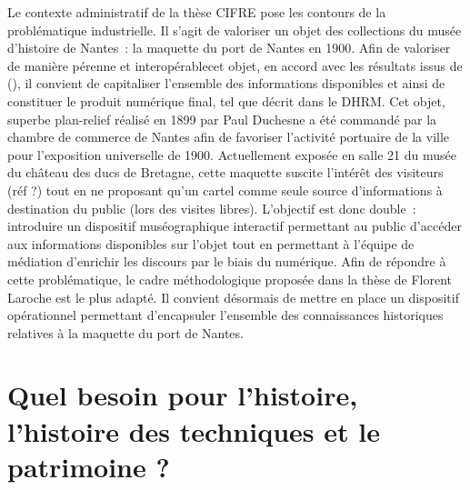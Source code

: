 \documentclass[a4paper,11pt,french]{article}
\begin{document}
Le contexte administratif de la thèse CIFRE pose les contours de la problématique industrielle. Il s'agit de valoriser un objet des collections du musée d'histoire de Nantes~: la maquette du port de Nantes en 1900. Afin de valoriser de manière pérenne et interopérablecet objet, en accord avec les résultats issus de (), il convient de capitaliser l'ensemble des informations disponibles et ainsi de constituer le produit numérique final, tel que décrit dans le DHRM.
Cet objet, superbe plan-relief réalisé en 1899 par Paul Duchesne a été commandé par la chambre de commerce de Nantes afin de favoriser l'activité portuaire de la ville pour l'exposition universelle de 1900. Actuellement exposée en salle 21 du musée du château des ducs de Bretagne, cette maquette suscite l'intérêt des visiteurs (réf ?) tout en ne proposant qu'un cartel comme seule source d'informations à destination du public (lors des visites libres). L'objectif est donc double~: introduire un dispositif muséographique interactif permettant au public d'accéder aux informations disponibles sur l'objet tout en permettant à l'équipe de médiation d'enrichir les discours par le biais du numérique.
Afin de répondre à cette problématique, le cadre méthodologique proposée dans la thèse de Florent Laroche est le plus adapté. Il convient désormais de mettre en place un dispositif opérationnel permettant d'encapsuler l'ensemble des connaissances historiques relatives à la maquette du port de Nantes.

\section{Quel besoin pour l'histoire, l'histoire des techniques et le patrimoine ?}
\end{document}
